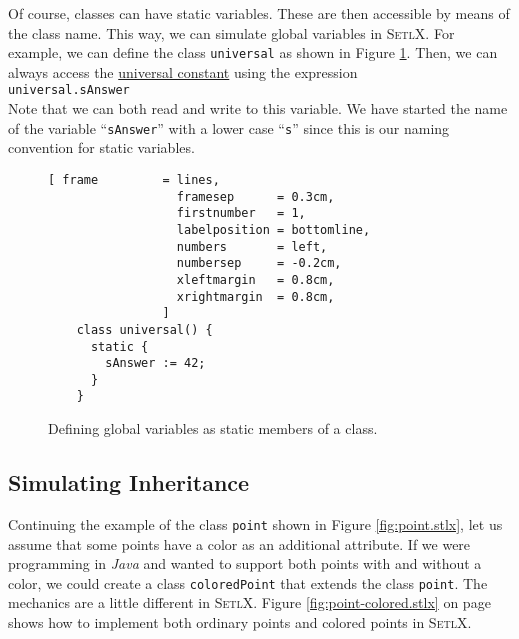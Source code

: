 Of course, classes can have static variables.  These are
then accessible by means  of the class name.  This way, we can simulate global variables in
\textsc{SetlX}.  For example, we can define the class \texttt{universal} as shown in Figure
\ref{fig:universal.stlx}.  Then, we can always access the 
\href{http://en.wikipedia.org/wiki/Answer_to_the_Ultimate_Question_of_Life,_the_Universe,_and_Everything#Answer_to_the_Ultimate_Question_of_Life.2C_the_Universe_and_Everything_.2842.29}{universal constant}
 using the expression
\\[0.2cm]
\hspace*{1.3cm}
\texttt{universal.sAnswer}
\\[0.2cm]
Note that we can both read and write to this variable.  We have started the name of the variable
``\texttt{sAnswer}'' with a lower case ``\texttt{s}'' since this is our naming convention for static variables.
\begin{figure}[!ht]
\centering
\begin{Verbatim}[ frame         = lines, 
                  framesep      = 0.3cm, 
                  firstnumber   = 1,
                  labelposition = bottomline,
                  numbers       = left,
                  numbersep     = -0.2cm,
                  xleftmargin   = 0.8cm,
                  xrightmargin  = 0.8cm,
                ]
    class universal() {
      static {
        sAnswer := 42;
      }
    }
\end{Verbatim}
\vspace*{-0.3cm}
\caption{Defining global variables as static members of a class.}
\label{fig:universal.stlx}
\end{figure}



\subsection{Simulating Inheritance}
Continuing the example of the class \texttt{point} shown in Figure \ref{fig:point.stlx}, let us
assume that some points have a color as an additional attribute.  If we were programming in
\textsl{Java} and wanted to support both points with and without a color, we could create a class
\texttt{coloredPoint} that extends the class \texttt{point}.  The mechanics are a little different
in \textsc{SetlX}.  Figure \ref{fig:point-colored.stlx} on page \pageref{fig:point-colored.stlx}
shows how to implement both ordinary points and colored points in \textsc{SetlX}.

